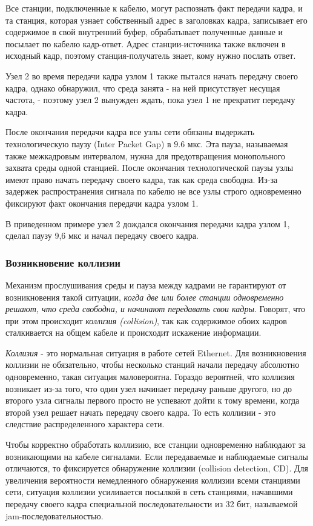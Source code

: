Все станции, подключенные к кабелю, могут распознать факт передачи кадра, и та станция, которая узнает собственный адрес в заголовках кадра, записывает его содержимое в свой внутренний буфер, обрабатывает полученные данные и посылает по кабелю кадр-ответ.
Адрес станции-источника также включен в исходный кадр, поэтому станция-получатель знает, кому нужно послать ответ.

Узел 2 во время передачи кадра узлом 1 также пытался начать передачу своего кадра, однако обнаружил, что среда занята - на ней присутствует несущая частота, - поэтому узел 2 вынужден ждать, пока узел 1 не прекратит передачу кадра.

После окончания передачи кадра все узлы сети обязаны выдержать технологическую паузу (Inter Packet Gap) в $9.6 \text{~мкс}$.
Эта пауза, называемая также межкадровым интервалом, нужна для предотвращения монопольного захвата среды одной станцией.
После окончания технологической паузы узлы имеют  право начать передачу своего кадра, так как среда свободна.
Из-за задержек распространения сигнала по кабелю не все узлы строго одновременно фиксируют факт окончания передачи кадра узлом 1.

В приведенном примере узел 2 дождался окончания передачи кадра узлом 1,  сделал паузу 9,6 мкс и начал передачу своего кадра.

\subsubsection{Возникновение коллизии}
Механизм прослушивания среды и пауза между кадрами не гарантируют от возникновения такой ситуации, \emph{когда две или более станции одновременно решают, что среда свободна, и начинают передавать свои кадры}.
Говорят, что при этом происходит \emph{коллизия (collision)}, так как содержимое обоих кадров сталкивается на общем кабеле и происходит искажение информации.

\emph{Коллизия} - это нормальная ситуация в работе сетей Ethernet.
Для возникновения коллизии не обязательно, чтобы несколько станций начали передачу абсолютно одновременно, такая ситуация маловероятна.
Гораздо вероятней, что коллизия возникает из-за того, что один узел начинает передачу раньше другого, но до второго узла сигналы первого просто не успевают дойти к тому времени, когда второй узел решает начать передачу своего кадра.
То есть коллизии - это следствие распределенного характера сети.

Чтобы корректно обработать коллизию, все станции одновременно наблюдают за возникающими на кабеле сигналами.
Если передаваемые и наблюдаемые сигналы отличаются, то фиксируется обнаружение коллизии (collision detection, CD).
Для увеличения вероятности немедленного обнаружения коллизии всеми станциями сети, ситуация коллизии усиливается посылкой в сеть станциями, начавшими передачу своего кадра  специальной последовательности из 32 бит, называемой jam-последовательностью.

